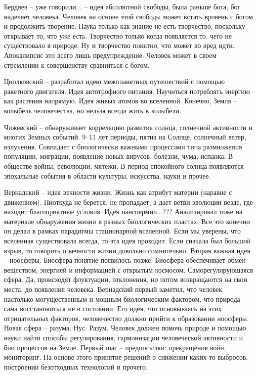 \documentclass[a4paper, 12pt]{article}
\begin{document}
Бердяев -- уже говорили... -- идея абсолютной свободы, была раньше бога, 
бог наделяет человека. Человек на основе этой свободы может встать 
вровень с богом и продолжить творение. Наука только как знание не есть 
творчество, поскольку открывает то, что уже есть. Творчество только 
когда появляется то, чего не существовало в природе. Ну и творчество 
понятно, что может во вред идти. Апокалипсис это всего лишь 
предупреждение. Человек может в своем стремлении к совершенству 
сравниться с богом.

Циолковский -- разработал идею межпланетных путешествий с помощью 
ракетного двигателя. Идея автотрофного питания. Научиться потреблять 
энергию как растения напрямую. Идея живых атомов во вселенной. Конечно, 
Земля -- колыбель человечества, но нельзя всегда жить в колыбели.

Чижевский -- обнаруживает корреляцию развития солнца, солнечной 
активности и многих Земных событий. 9--11 лет периоды, пятна на Солнце, 
солнечный ветер, излучения. Совпадает с биологически важными процессами 
типа размножения популяции, миграции, появление новых вирусов, болезни, 
чума, испанка. В обществе войны, революции, мятежи. В период спокойного 
солнца появляются эпохальные события в области культуры, искусства, 
науки и прочее.

Вернадский -- идея вечности жизни. Жизнь как атрибут материи (наравне 
с движением). Ниоткуда не берется, не пропадает, а дает ветви эволюции 
везде, где находит благоприятные условия. Идея панспермии...??? 
Анализировал тоже на материале обнаружения жизни в разных биологических 
пластах. Все это конечно он делал в рамках парадигмы стационарной 
вселенной. Если мы уверены, что вселенная существовала всегда, то эта 
идея проходит. Если сначала был большой взрыв, то говорить о вечности 
жизни довольно сомнительно. Вторая важная идея -- ноосферы. Биосфера 
понятие появилось позже. Биосфера обеспечивает обмен веществом, энергией 
и информацией с открытым космосом. Саморегулирующаяся сфера. Да, 
происходят флуктуации, отклонения, но потом возвращаются на свои места, 
до появления человека. Вернадский первый заметил, что человек настолько 
могущественным и мощным биологическим фактором, что природа сама 
восстановиться не в состоянии. Его идея, что основываясь на этих 
отрицательных факторов, человечество должно прийти к образовании 
ноосферы. Новая сфера -- разума. Нус. Разум. Человек должен помочь 
природе и помощью науки найти способы регулирования, гармонизации 
человеческой активности и био процессов на Земле. Первый шаг -- 
предпосылки: прекращение войн, мониторинг. На основе этого принятие 
решений о снижении каких-то выбросов, построении безотходных технологий 
и прочего.
\end{document}
